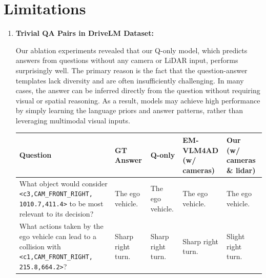 \documentclass{article} %
\begin{document}
\clearpage
\section{Limitations}
\begin{enumerate}
\item \textbf{Trivial QA Pairs in DriveLM Dataset:}

Our ablation experiments revealed that our Q-only model, which predicts answers from questions without any camera or LiDAR input, performs surprisingly well.
The primary reason is the fact that the question-answer templates lack diversity and are often insufficiently challenging. In many cases, the answer can be inferred directly from the question without requiring visual or spatial reasoning. As a result, models may achieve high performance by simply learning the language priors and answer patterns, rather than leveraging multimodal visual inputs.
\begin{table}[htbp]
    \centering
    \begin{tabular}{|p{4.2cm}|p{2.3cm}|p{2.3cm}|p{2.5cm}|p{3.0cm}|}
        \hline
        \textbf{Question} & \textbf{GT Answer} & \textbf{Q-only} & \makecell{\textbf{EM-VLM4AD}\\(w/ cameras)} & \makecell{\textbf{Our}\\(w/ cameras \& lidar)} \\
        \hline
        What object would consider \texttt{<c3,CAM\_FRONT\_RIGHT,} \texttt{1010.7,411.4>} to be most relevant to its decision? & The ego vehicle. & The ego vehicle. & The ego vehicle. & The ego vehicle. \\
        \hline
        What actions taken by the ego vehicle can lead to a collision with \texttt{<c1,CAM\_FRONT\_RIGHT,} \texttt{215.8,664.2>}? & Sharp right turn. & Sharp right turn. & Sharp right turn. & Slight right turn. \\

\end{tabular}
\end{table}
\end{enumerate}
\end{document}
